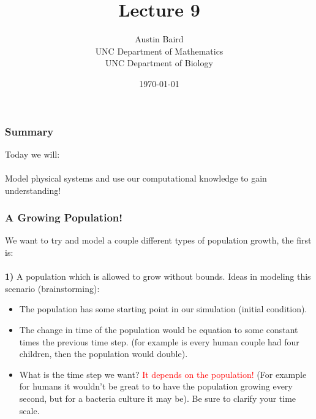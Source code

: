 \documentclass[serif]{beamer}
\title{Lecture 9}
\author{Austin Baird\\UNC Department of Mathematics\\UNC Department of Biology}
\date{\today}
\begin{document}
\frame{\titlepage}

\begin{frame}
\frametitle{Summary}

Today we will: 
\ \\
\ \\
Model physical systems and use our computational knowledge to gain understanding! 

\end{frame}

\begin{frame}
\frametitle{A Growing Population!}

We want to try and model a couple different types of population growth, the first is:\\
\ \\
\textbf{1)} A population which is allowed to grow without bounds. Ideas in modeling this scenario (brainstorming): 

\begin{itemize}
\item The population has some starting point in our simulation (initial condition). 
\item The change in time of the population would be equation to some constant times the previous time step. (for example is every human couple had four children, then the population would double). 
\item What is the time step we want? \textcolor{red}{It depends on the population!} (For example for humans it wouldn't be great to to have the population growing every second, but for a bacteria culture it may be). Be sure to clarify your time scale. 
\end{itemize}

\end{frame}


\end{document}
